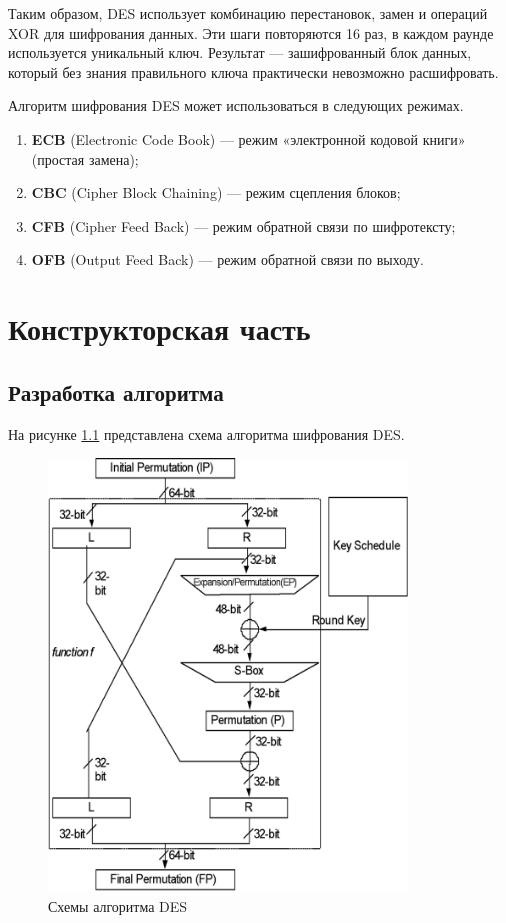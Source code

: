 Таким образом, DES использует комбинацию перестановок, замен и операций XOR для шифрования данных. Эти шаги повторяются 16 раз, в каждом раунде используется уникальный ключ. Результат --- зашифрованный блок данных, который без знания правильного ключа практически невозможно расшифровать.

Алгоритм шифрования DES может использоваться в следующих режимах.

\begin{enumerate}
	\item[1.] \textbf{ECB} (Electronic Code Book) --- режим «электронной кодовой книги» (простая замена);
	\item[2.] \textbf{CBC} (Cipher Block Chaining) --- режим сцепления блоков;
	\item[3.] \textbf{CFB} (Cipher Feed Back) --- режим обратной связи по шифротексту;
	\item[4.] \textbf{OFB} (Output Feed Back) --- режим обратной связи по выходу.
\end{enumerate}

\chapter{Конструкторская часть}

\section{Разработка алгоритма}

На рисунке \ref{fig:algo} представлена схема алгоритма шифрования DES.

\begin{figure}[h!]
	\centering
	\includegraphics[width=0.85\textwidth]{img/des.png}
	\caption{Схемы алгоритма DES}
	\label{fig:algo}
\end{figure}
\clearpage
